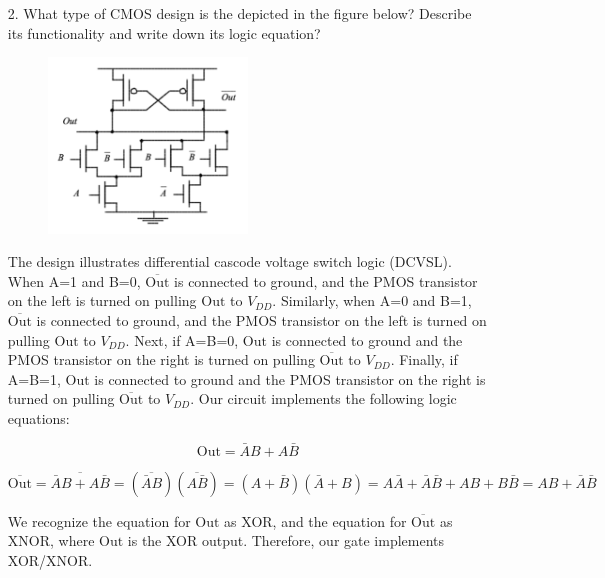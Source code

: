 \documentclass[fleqn]{article}
\begin{document}
\begin{enumerate}
\begin{enumerate}
			\item[2.] What type of CMOS design is the depicted in the figure below? Describe its functionality and write down its logic equation?
			
			\begin{figure}[H]
				\centerline{\includegraphics[width=0.5\textwidth]{circuit4b.png}}
				\label{fig::circuit4b}
			\end{figure}
			
			The design illustrates differential cascode voltage switch logic (DCVSL). When A=1 and B=0, $\overline{\text{Out}}$ is connected to ground, and the PMOS transistor on the left is turned on pulling $\text{Out}$ to $V_{DD}$. Similarly, when A=0 and B=1, $\overline{\text{Out}}$ is connected to ground, and the PMOS transistor on the left is turned on pulling $\text{Out}$ to $V_{DD}$. Next, if A=B=0, $\text{Out}$ is connected to ground and the PMOS transistor on the right is turned on pulling $\overline{\text{Out}}$ to $V_{DD}$. Finally, if A=B=1, $\text{Out}$ is connected to ground and the PMOS transistor on the right is turned on pulling $\overline{\text{Out}}$ to $V_{DD}$. Our circuit implements the following logic equations:
			
			\begin{equation*}
				\text{Out} = \bar{A}B + A\bar{B}
			\end{equation*}
			
			\begin{equation*}
				\overline{\text{Out}} = \overline{\bar{A}B + A\bar{B}} = (\overline{\bar{A}B})(\overline{A\bar{B}}) = (A + \bar{B})(\bar{A} + B) = A\bar{A} + \bar{A}\bar{B} + AB + B\bar{B} = AB + \bar{A}\bar{B}
			\end{equation*}
			
			We recognize the equation for $\text{Out}$ as XOR, and the equation for $\overline{\text{Out}}$ as XNOR, where $\text{Out}$ is the XOR output. Therefore, our gate implements XOR/XNOR.
			
			\end{enumerate}			 
	\end{enumerate}
\end{document}
